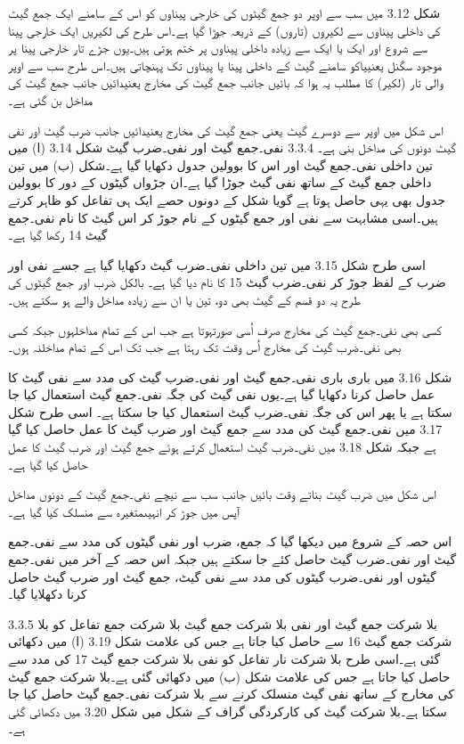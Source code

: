 	شکل 3.12 میں سب سے اوپر دو جمع گیٹوں کی خارجی پیناوں  کو اس کے سامنے ایک جمع گیٹ کی داخلی پیناوں  سے لکیروں (تاروں) کے ذریعہ جوڑا گیا ہے۔اس طرح کی لکیریں ایک خارجی پینا سے شروع اور ایک یا ایک سے زیادہ داخلی پیناوں  پر ختم ہوتی ہیں۔یوں جڑے تار خارجی پینا پر موجود سگنل یعنییاکو سامنے گیٹ کے داخلی پینا یا پیناوں  تک پہنچاتی ہیں۔اس طرح سب سے اوپر والی تار (لکیر) کا مطلب یہ ہوا کہ بائیں جانب جمع گیٹ کی مخارج یعنیدائیں جانب جمع گیٹ کی مداخل بن گئی ہے۔

	اس شکل میں اوپر سے دوسرے گیٹ یعنی جمع گیٹ کی مخارج یعنیدائیں جانب ضرب گیٹ اور نفی گیٹ دونوں کی مداخل بنی ہے۔
3.3.4 نفی۔جمع گیٹ اور نفی۔ضرب گیٹ
	شکل 3.14 (ا) میں تین داخلی نفی۔جمع گیٹ اور اس کا بوولین جدول دکھایا گیا ہے۔شکل (ب) میں تین داخلی جمع گیٹ کے ساتھ نفی گیٹ جوڑا گیا ہے۔ان جڑواں گیٹوں کے دور کا بوولین جدول بھی یہی حاصل ہوتا ہے گویا شکل کے دونوں حصے ایک ہی تفاعل کو ظاہر کرتے ہیں۔اسی مشابہت سے نفی اور جمع گیٹوں کے نام جوڑ کر اس گیٹ کا نام نفی۔جمع گیٹ 14 رکھا گیا ہے۔



	اسی طرح شکل 3.15 میں تین داخلی نفی۔ضرب گیٹ دکھایا گیا ہے جسے نفی اور ضرب کے لفظ جوڑ کر نفی۔ضرب گیٹ 15 کا نام دیا گیا ہے۔
	بالکل ضرب اور جمع گیٹوں کی طرح یہ دو قسم کے گیٹ بھی دو، تین یا ان سے زیادہ مداخل والے ہو سکتے ہیں۔


	کسی بھی نفی۔جمع گیٹ کی مخارج صرف اُسی صورتہوتا ہے جب اس کے تمام مداخلہوں جبکہ کسی بھی نفی۔ضرب گیٹ کی مخارج اُس وقت تک  رہتا ہے جب تک اس کے تمام مداخلنہ ہوں۔

	شکل 3.16 میں باری باری  نفی۔جمع گیٹ اور نفی۔ضرب گیٹ کی مدد سے نفی گیٹ کا عمل حاصل کرنا دکھایا گیا ہے۔یوں نفی گیٹ کی جگہ نفی۔جمع گیٹ استعمال کیا جا سکتا ہے یا پھر اس کی جگہ نفی۔ضرب گیٹ استعمال کیا جا سکتا ہے۔
	اسی طرح شکل 3.17 میں نفی۔جمع گیٹ کی مدد سے جمع گیٹ اور ضرب گیٹ کا عمل حاصل کیا گیا ہے جبکہ شکل 3.18 میں نفی۔ضرب گیٹ استعمال کرتے ہوئے جمع گیٹ اور ضرب گیٹ کا عمل حاصل کیا گیا ہے۔



	اس شکل میں ضرب گیٹ بناتے وقت بائیں جانب سب سے نیچے نفی۔جمع گیٹ کے دونوں مداخل آپس میں جوڑ کر انہیںمتغیرہ سے منسلک کیا گیا ہے۔

	اس حصہ کے شروع میں دیکھا گیا کہ جمع، ضرب اور نفی گیٹوں کی مدد سے نفی۔جمع گیٹ اور نفی۔ضرب گیٹ حاصل کئے جا سکتے ہیں جبکہ اس حصہ کے آخر میں نفی۔جمع گیٹوں اور نفی۔ضرب گیٹوں کی مدد سے نفی گیٹ، جمع گیٹ اور ضرب گیٹ حاصل کرنا دکھلایا گیا۔

3.3.5 بلا شرکت جمع گیٹ اور نفی بلا شرکت جمع گیٹ
	بلا شرکت جمع تفاعل کو بلا شرکت جمع گیٹ 16 سے حاصل کیا جاتا ہے جس کی علامت شکل 3.19 (ا) میں دکھائی گئی ہے۔اسی طرح بلا شرکت نار تفاعل کو نفی بلا شرکت جمع گیٹ 17 کی مدد سے حاصل کیا جاتا ہے جس کی علامت شکل (ب) میں دکھائی گئی ہے۔بلا شرکت جمع گیٹ کی مخارج کے ساتھ نفی گیٹ منسلک کرنے سے بلا شرکت نفی۔جمع گیٹ حاصل کیا جا سکتا ہے۔بلا شرکت گیٹ کی کارکردگی گراف کے شکل میں شکل 3.20 میں دکھائی گئی ہے۔

